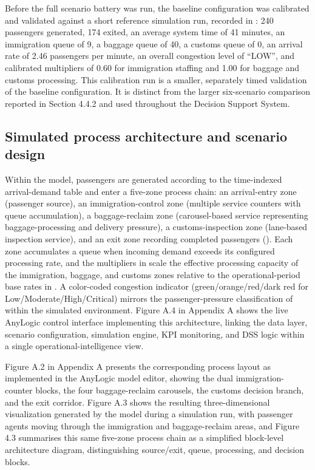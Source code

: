 Before the full scenario battery was run, the baseline configuration was calibrated and validated against a short reference simulation run, recorded in : 240 passengers generated, 174 exited, an average system time of 41 minutes, an immigration queue of 9, a baggage queue of 40, a customs queue of 0, an arrival rate of 2.46 passengers per minute, an overall congestion level of ``LOW'', and calibrated multipliers of 0.60 for immigration staffing and 1.00 for baggage and customs processing. This calibration run is a smaller, separately timed validation of the baseline configuration. It is distinct from the larger six-scenario comparison reported in Section 4.4.2 and used throughout the Decision Support System.

\subsection{Simulated process architecture and scenario design}
\label{subsec:simulation-architecture-scenarios}

Within the model, passengers are generated according to the time-indexed arrival-demand table and enter a five-zone process chain: an arrival-entry zone (passenger source), an immigration-control zone (multiple service counters with queue accumulation), a baggage-reclaim zone (carousel-based service representing baggage-processing and delivery pressure), a customs-inspection zone (lane-based inspection service), and an exit zone recording completed passengers (). Each zone accumulates a queue when incoming demand exceeds its configured processing rate, and the multipliers in  scale the effective processing capacity of the immigration, baggage, and customs zones relative to the operational-period base rates in . A color-coded congestion indicator (green/orange/red/dark red for Low/Moderate/High/Critical) mirrors the passenger-pressure classification of  within the simulated environment. Figure A.4 in Appendix A shows the live AnyLogic control interface implementing this architecture, linking the data layer, scenario configuration, simulation engine, KPI monitoring, and DSS logic within a single operational-intelligence view.

Figure A.2 in Appendix A presents the corresponding process layout as implemented in the AnyLogic model editor, showing the dual immigration-counter blocks, the four baggage-reclaim carousels, the customs decision branch, and the exit corridor. Figure A.3 shows the resulting three-dimensional visualization generated by the model during a simulation run, with passenger agents moving through the immigration and baggage-reclaim areas, and Figure 4.3 summarises this same five-zone process chain as a simplified block-level architecture diagram, distinguishing source/exit, queue, processing, and decision blocks.

